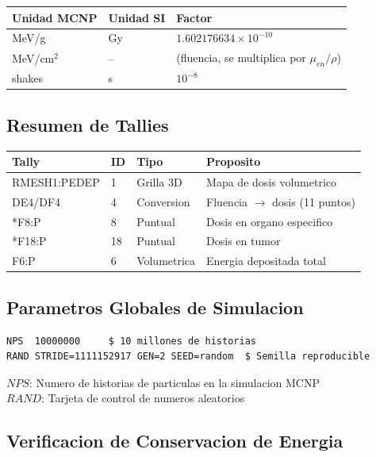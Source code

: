 \documentclass[12pt,a4paper]{article}
\newcommand{\vardef}[2]{\noindent\textbf{#1}: #2\\}
\begin{document}
\begin{center}
\begin{tabular}{lll}
\toprule
\textbf{Unidad MCNP} & \textbf{Unidad SI} & \textbf{Factor} \\
\midrule
MeV/g & Gy & $1.602176634 \times 10^{-10}$ \\
MeV/cm$^2$ & -- & (fluencia, se multiplica por $\mu_{en}/\rho$) \\
shakes & s & $10^{-8}$ \\
\bottomrule
\end{tabular}
\end{center}

\subsection{Resumen de Tallies}

\begin{center}
\begin{tabular}{llll}
\toprule
\textbf{Tally} & \textbf{ID} & \textbf{Tipo} & \textbf{Proposito} \\
\midrule
RMESH1:PEDEP & 1 & Grilla 3D & Mapa de dosis volumetrico \\
DE4/DF4 & 4 & Conversion & Fluencia $\to$ dosis (11 puntos) \\
*F8:P & 8 & Puntual & Dosis en organo especifico \\
*F18:P & 18 & Puntual & Dosis en tumor \\
F6:P & 6 & Volumetrica & Energia depositada total \\
\bottomrule
\end{tabular}
\end{center}

\subsection{Parametros Globales de Simulacion}

\begin{verbatim}
NPS  10000000     $ 10 millones de historias
RAND STRIDE=1111152917 GEN=2 SEED=random  $ Semilla reproducible
\end{verbatim}

\vardef{$NPS$}{Numero de historias de particulas en la simulacion MCNP}
\vardef{$RAND$}{Tarjeta de control de numeros aleatorios}

\subsection{Verificacion de Conservacion de Energia}
\end{document}
